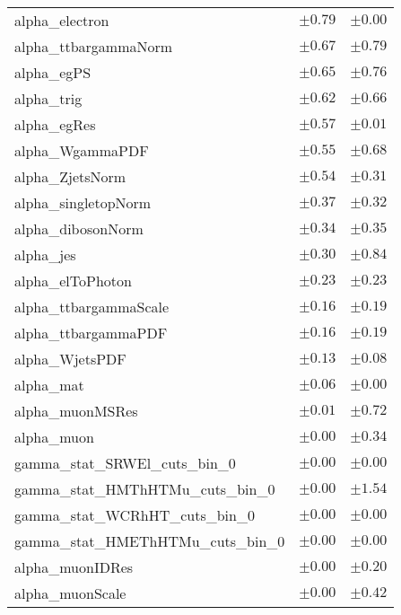 \begin{table}
\begin{center}
\begin{tabular*}{\textwidth}{@{\extracolsep{\fill}}lcc}
alpha\_electron         & $\pm 0.79$          & $\pm 0.00$       \\
alpha\_ttbargammaNorm         & $\pm 0.67$          & $\pm 0.79$       \\
alpha\_egPS         & $\pm 0.65$          & $\pm 0.76$       \\
alpha\_trig         & $\pm 0.62$          & $\pm 0.66$       \\
alpha\_egRes         & $\pm 0.57$          & $\pm 0.01$       \\
alpha\_WgammaPDF         & $\pm 0.55$          & $\pm 0.68$       \\
alpha\_ZjetsNorm         & $\pm 0.54$          & $\pm 0.31$       \\
alpha\_singletopNorm         & $\pm 0.37$          & $\pm 0.32$       \\
alpha\_dibosonNorm         & $\pm 0.34$          & $\pm 0.35$       \\
alpha\_jes         & $\pm 0.30$          & $\pm 0.84$       \\
alpha\_elToPhoton         & $\pm 0.23$          & $\pm 0.23$       \\
alpha\_ttbargammaScale         & $\pm 0.16$          & $\pm 0.19$       \\
alpha\_ttbargammaPDF         & $\pm 0.16$          & $\pm 0.19$       \\
alpha\_WjetsPDF         & $\pm 0.13$          & $\pm 0.08$       \\
alpha\_mat         & $\pm 0.06$          & $\pm 0.00$       \\
alpha\_muonMSRes         & $\pm 0.01$          & $\pm 0.72$       \\
alpha\_muon         & $\pm 0.00$          & $\pm 0.34$       \\
gamma\_stat\_SRWEl\_cuts\_bin\_0         & $\pm 0.00$          & $\pm 0.00$       \\
gamma\_stat\_HMThHTMu\_cuts\_bin\_0         & $\pm 0.00$          & $\pm 1.54$       \\
gamma\_stat\_WCRhHT\_cuts\_bin\_0         & $\pm 0.00$          & $\pm 0.00$       \\
gamma\_stat\_HMEThHTMu\_cuts\_bin\_0         & $\pm 0.00$          & $\pm 0.00$       \\
alpha\_muonIDRes         & $\pm 0.00$          & $\pm 0.20$       \\
alpha\_muonScale         & $\pm 0.00$          & $\pm 0.42$       \\

\end{tabular*}
\end{center}
\end{table}
